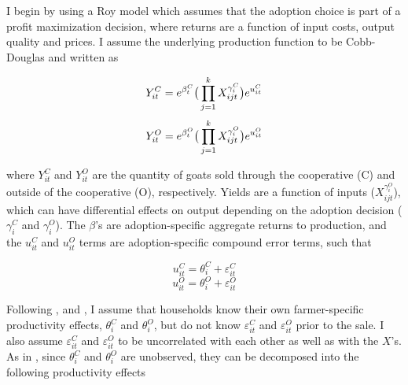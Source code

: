 \documentclass[11pt]{article}
\begin{document}
I begin by using a Roy model which assumes that the adoption choice is part of a profit maximization decision, where returns are a function of input costs, output quality and prices. I assume the underlying production function to be Cobb-Douglas and written as

\begin{equation} \label{eq:E2_yield.C}
    Y^{C}_{it} = e^{\beta^{C}_{t}}\big{(}\prod_{j=1}^{k}X^{\gamma^{C}_{i}}_{ijt}\big{)}e^{u^{C}_{it}}
\end{equation}   
\begin{equation} \label{eq:E2_yield.O}    
    Y^{O}_{it} = e^{\beta^{O}_{t}}\big{(}\prod_{j=1}^{k}X^{\gamma^{O}_{i}}_{ijt}\big{)}e^{u^{O}_{it}}
\end{equation}

where $Y^{C}_{it}$ and $Y^{O}_{it}$ are the quantity of goats sold through the cooperative (C) and outside of the cooperative (O), respectively. Yields are a function of inputs ($X^{\gamma^{O}_{i}}_{ijt}$), which can have differential effects on output depending on the adoption decision ($\gamma^{C}_{i}$ and $\gamma^{O}_{i}$). The $\beta$’s are adoption-specific aggregate returns to production, and the $u^{C}_{it}$ and $u^{O}_{it}$ terms are adoption-specific compound error terms, such that

\begin{equation} \label{eq:E2_u.C}
    u^{C}_{it} = \theta^{C}_{i} + \varepsilon^{C}_{it}
\end{equation}
\begin{equation} \label{eq:E2_u.O}
    u^{O}_{it} = \theta^{O}_{i} + \varepsilon^{O}_{it}
\end{equation}

Following \citet{carniero-et.al.15}, \citet{michler-et.al.18} and \citet{suri11}, I assume that households know their own farmer-specific productivity effects, $\theta^{C}_{i}$ and $\theta^{O}_{i}$, but do not know $\varepsilon^{C}_{it}$ and $\varepsilon^{O}_{it}$ prior to the sale. I also assume $\varepsilon^{C}_{it}$ and $\varepsilon^{O}_{it}$ to be uncorrelated with each other as well as with the $X$’s.
As in \citet{lemueux.98}, since $\theta^{C}_{i}$ and $\theta^{O}_{i}$ are unobserved, they can be decomposed into the following productivity effects %
\end{document}
